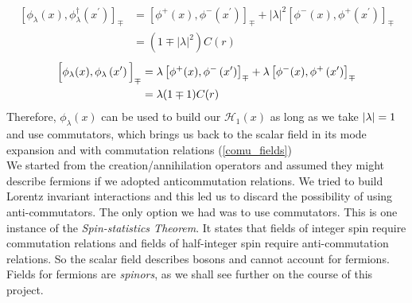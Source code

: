 \begin{equation}
\begin{aligned}
\left[\phi_{\lambda}(x), \phi_{\lambda}^{\dagger}\left(x^{\prime}\right)\right]_{\mp} &=\left[\phi^{+}(x), \phi^{-}\left(x^{\prime}\right)\right]_{\mp}+|\lambda|^{2}\left[\phi^{-}(x), \phi^{+}\left(x^{\prime}\right)\right]_{\mp} \\
&=\left(1 \mp|\lambda|^{2}\right) C(r)
\end{aligned}
\end{equation}
\begin{equation}
\begin{aligned}
\Big{[}\phi_{\lambda}(x), \phi_{\lambda}\left(x^{\prime}\right)\Big{]}_{\mp} &=\lambda\left[\phi^{+}(x), \phi^{-}\left(x^{\prime}\right)\right]_{\mp}+\lambda\left[\phi^{-}(x), \phi^{+}\left(x^{\prime}\right)\right]_{\mp} \\
&=\lambda(1 \mp 1) C(r)
\end{aligned}
\end{equation}
Therefore, $\phi_\lambda(x)$ can be used to build our $\mathcal{H}_1(x)$ as long as we take $\abs{\lambda}=1$ and use commutators, which brings us back to the scalar field in its mode expansion and with commutation relations (\ref{comu_fields})\\

 We started from the creation/annihilation operators and assumed they might describe fermions if we adopted anticommutation relations. We tried to build Lorentz invariant interactions and this led us to discard the possibility of using anti-commutators. The only option we had was to use commutators. This is one instance of the \textit{Spin-statistics Theorem}. It states that fields of integer spin require commutation relations and fields of half-integer spin require anti-commutation relations. So the scalar field describes bosons and cannot account for fermions. Fields for fermions are \textit{spinors}, as we shall see further on the course of this project.


